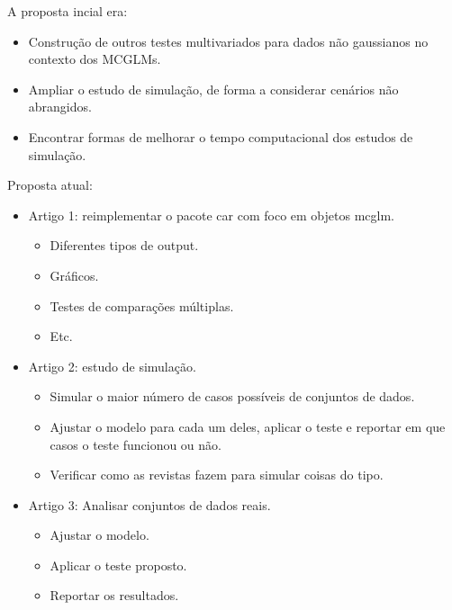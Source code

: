 \documentclass[10pt,
  aspectratio=169,
  serif,
  mathserif,
  professionalfont,
  compress,
  handout,
  ]{beamer}\usepackage[]{graphicx}\usepackage[]{color}
\begin{document}
\begin{frame}[c, allowframebreaks]

A proposta incial era:

\begin{itemize}
  \item Construção de outros testes multivariados para dados não gaussianos no contexto dos MCGLMs.
  \item Ampliar o estudo de simulação, de forma a considerar cenários não abrangidos.
  \item Encontrar formas de melhorar o tempo computacional dos estudos de simulação. 
\end{itemize}

\framebreak

Proposta atual:

\begin{itemize}
  \item Artigo 1: reimplementar o pacote car com foco em objetos mcglm.
    \begin{itemize}
      \item Diferentes tipos de output.
      \item Gráficos.
      \item Testes de comparações múltiplas.
      \item Etc.
    \end{itemize}

  \item Artigo 2: estudo de simulação.
    \begin{itemize}
      \item Simular o maior número de casos possíveis de conjuntos de dados.
      \item Ajustar o modelo para cada um deles, aplicar o teste e reportar em que casos o teste funcionou ou não.
      \item Verificar como as revistas fazem para simular coisas do tipo.
    \end{itemize}
    
  \item Artigo 3: Analisar conjuntos de dados reais.
    \begin{itemize}
      \item Ajustar o modelo.
      \item Aplicar o teste proposto.
      \item Reportar os resultados.
    \end{itemize}
\end{itemize}


\end{frame}
\end{document}
